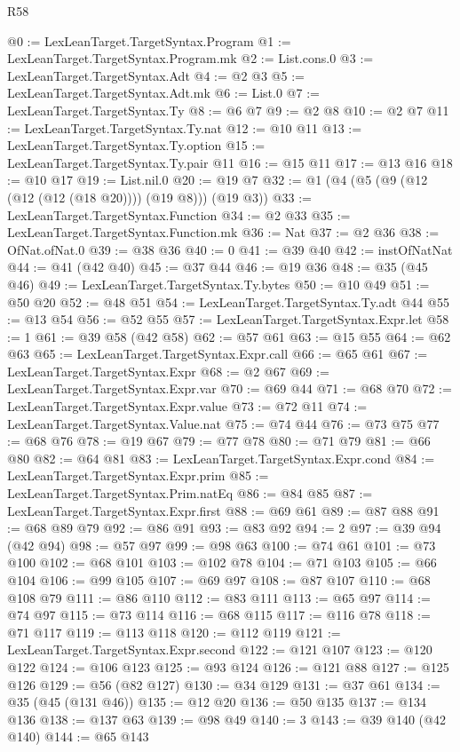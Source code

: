 \begin{lexlean}{R58}
\begin{coremodule}
@0 := LexLeanTarget.TargetSyntax.Program
@1 := LexLeanTarget.TargetSyntax.Program.mk
@2 := List.cons.{0}
@3 := LexLeanTarget.TargetSyntax.Adt
@4 := @2 @3
@5 := LexLeanTarget.TargetSyntax.Adt.mk
@6 := List.{0}
@7 := LexLeanTarget.TargetSyntax.Ty
@8 := @6 @7
@9 := @2 @8
@10 := @2 @7
@11 := LexLeanTarget.TargetSyntax.Ty.nat
@12 := @10 @11
@13 := LexLeanTarget.TargetSyntax.Ty.option
@15 := LexLeanTarget.TargetSyntax.Ty.pair @11
@16 := @15 @11
@17 := @13 @16
@18 := @10 @17
@19 := List.nil.{0}
@20 := @19 @7
@32 := @1 (@4 (@5 (@9 (@12 (@12 (@12 (@18 @20)))) (@19 @8))) (@19 @3))
@33 := LexLeanTarget.TargetSyntax.Function
@34 := @2 @33
@35 := LexLeanTarget.TargetSyntax.Function.mk
@36 := Nat
@37 := @2 @36
@38 := OfNat.ofNat.{0}
@39 := @38 @36
@40 := 0
@41 := @39 @40
@42 := instOfNatNat
@44 := @41 (@42 @40)
@45 := @37 @44
@46 := @19 @36
@48 := @35 (@45 @46)
@49 := LexLeanTarget.TargetSyntax.Ty.bytes
@50 := @10 @49
@51 := @50 @20
@52 := @48 @51
@54 := LexLeanTarget.TargetSyntax.Ty.adt @44
@55 := @13 @54
@56 := @52 @55
@57 := LexLeanTarget.TargetSyntax.Expr.let
@58 := 1
@61 := @39 @58 (@42 @58)
@62 := @57 @61
@63 := @15 @55
@64 := @62 @63
@65 := LexLeanTarget.TargetSyntax.Expr.call
@66 := @65 @61
@67 := LexLeanTarget.TargetSyntax.Expr
@68 := @2 @67
@69 := LexLeanTarget.TargetSyntax.Expr.var
@70 := @69 @44
@71 := @68 @70
@72 := LexLeanTarget.TargetSyntax.Expr.value
@73 := @72 @11
@74 := LexLeanTarget.TargetSyntax.Value.nat
@75 := @74 @44
@76 := @73 @75
@77 := @68 @76
@78 := @19 @67
@79 := @77 @78
@80 := @71 @79
@81 := @66 @80
@82 := @64 @81
@83 := LexLeanTarget.TargetSyntax.Expr.cond
@84 := LexLeanTarget.TargetSyntax.Expr.prim
@85 := LexLeanTarget.TargetSyntax.Prim.natEq
@86 := @84 @85
@87 := LexLeanTarget.TargetSyntax.Expr.first
@88 := @69 @61
@89 := @87 @88
@91 := @68 @89 @79
@92 := @86 @91
@93 := @83 @92
@94 := 2
@97 := @39 @94 (@42 @94)
@98 := @57 @97
@99 := @98 @63
@100 := @74 @61
@101 := @73 @100
@102 := @68 @101
@103 := @102 @78
@104 := @71 @103
@105 := @66 @104
@106 := @99 @105
@107 := @69 @97
@108 := @87 @107
@110 := @68 @108 @79
@111 := @86 @110
@112 := @83 @111
@113 := @65 @97
@114 := @74 @97
@115 := @73 @114
@116 := @68 @115
@117 := @116 @78
@118 := @71 @117
@119 := @113 @118
@120 := @112 @119
@121 := LexLeanTarget.TargetSyntax.Expr.second
@122 := @121 @107
@123 := @120 @122
@124 := @106 @123
@125 := @93 @124
@126 := @121 @88
@127 := @125 @126
@129 := @56 (@82 @127)
@130 := @34 @129
@131 := @37 @61
@134 := @35 (@45 (@131 @46))
@135 := @12 @20
@136 := @50 @135
@137 := @134 @136
@138 := @137 @63
@139 := @98 @49
@140 := 3
@143 := @39 @140 (@42 @140)
@144 := @65 @143

\end{coremodule}
\end{lexlean}
